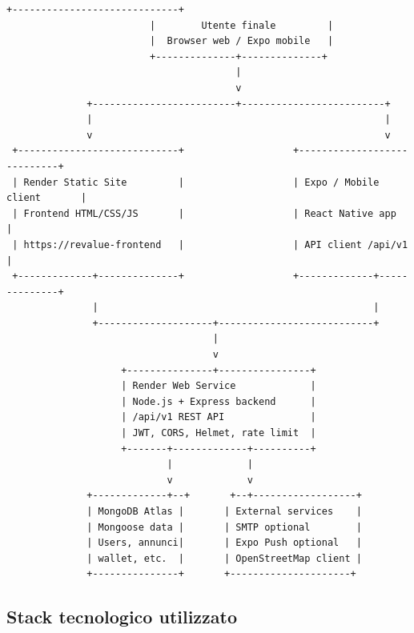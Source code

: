 \documentclass[11pt,a4paper]{article}
\begin{document}
\begin{lstlisting}[style=plaincode]
                         +-----------------------------+
                         |        Utente finale         |
                         |  Browser web / Expo mobile   |
                         +--------------+--------------+
                                        |
                                        v
              +-------------------------+-------------------------+
              |                                                   |
              v                                                   v
 +----------------------------+                   +----------------------------+
 | Render Static Site         |                   | Expo / Mobile client       |
 | Frontend HTML/CSS/JS       |                   | React Native app          |
 | https://revalue-frontend   |                   | API client /api/v1        |
 +-------------+--------------+                   +-------------+--------------+
               |                                                |
               +--------------------+---------------------------+
                                    |
                                    v
                    +---------------+----------------+
                    | Render Web Service             |
                    | Node.js + Express backend      |
                    | /api/v1 REST API               |
                    | JWT, CORS, Helmet, rate limit  |
                    +-------+-------------+----------+
                            |             |
                            v             v
              +-------------+--+       +--+------------------+
              | MongoDB Atlas |       | External services    |
              | Mongoose data |       | SMTP optional        |
              | Users, annunci|       | Expo Push optional   |
              | wallet, etc.  |       | OpenStreetMap client |
              +---------------+       +---------------------+
\end{lstlisting}

\subsection{Stack tecnologico utilizzato}
\end{document}
